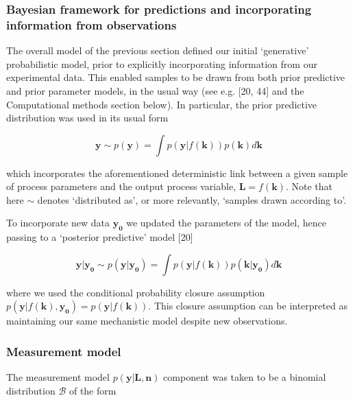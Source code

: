 \documentclass[10pt,letterpaper]{article}
\begin{document}
\subsubsection{Bayesian framework for predictions and incorporating
information from
observations}\label{bayesian-framework-for-predictions-and-incorporating-information-from-observations}

The overall model of the previous section defined our initial
`generative' probabilistic model, prior to explicitly incorporating
information from our experimental data. This enabled samples to be drawn
from both prior predictive and prior parameter models, in the usual way
(see e.g. {[}20, 44{]} and the Computational methods section below). In
particular, the prior predictive distribution was used in its usual form

\begin{equation}\mathbf{y} \sim p(\mathbf{y}) = \int p(\mathbf{y}|f(\mathbf{k}))p(\mathbf{k})d\mathbf{k}\label{eq:prior-predictive}\end{equation}

which incorporates the aforementioned deterministic link between a given
sample of process parameters and the output process variable,
\(\mathbf{L}=f(\mathbf{k})\). Note that here \(\sim\) denotes
`distributed as', or more relevantly, `samples drawn according to'.

To incorporate new data \(\mathbf{y_0}\) we updated the parameters of
the model, hence passing to a `posterior predictive' model {[}20{]}

\begin{equation}\mathbf{y} | \mathbf{y_0} \sim p(\mathbf{y}|\mathbf{y_0}) = \int p(\mathbf{y}|f(\mathbf{k}))p(\mathbf{k}|\mathbf{y_0})d\mathbf{k}\label{eq:posterior-predictive}\end{equation}

where we used the conditional probability closure assumption
\(p(\mathbf{y}|f(\mathbf{k}),\mathbf{y_0}) = p(\mathbf{y}|f(\mathbf{k}))\).
This closure assumption can be interpreted as maintaining our same
mechanistic model despite new observations.

\subsubsection{Measurement model}\label{measurement-model}

The measurement model \(p(\mathbf{y}|\mathbf{L},\mathbf{n})\) component
was taken to be a binomial distribution \(\mathcal{B}\) of the form
\end{document}
